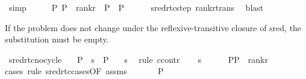 \begin{isabellebody}
\ simp\isanewline
\ \ \isamarkupfalse%
\ \isamarkupfalse%
\ {\isachardoublequoteopen}{\isacharparenleft}{\kern0pt}P{}{\isacharcomma}{\kern0pt}\ P{}{\isacharparenright}{\kern0pt}\ {\isasymin}\ rank{\isacharunderscore}{\kern0pt}r\ {\isasymor}\ P{}\ {\isacharequal}{\kern0pt}\ P{}{\isachardoublequoteclose}\isanewline
\ \ \ \ \isamarkupfalse%
\ sred{\isacharunderscore}{\kern0pt}rtc{\isacharunderscore}{\kern0pt}step\ rank{\isacharunderscore}{\kern0pt}r{\isacharunderscore}{\kern0pt}trans\ \isamarkupfalse%
\ blast\isanewline
{}\isamarkupfalse%
%
\endisatagproof
{\isafoldproof}%
%
\isadelimproof
%
\endisadelimproof
%
\begin{isamarkuptext}%
If the problem does not change under the reflexive-transitive closure of sred,
the substitution must be empty.%
\end{isamarkuptext}\isamarkuptrue%
\isamarkupfalse%
\ sred{\isacharunderscore}{\kern0pt}rtc{\isacharunderscore}{\kern0pt}no{\isacharunderscore}{\kern0pt}cycle{\isacharcolon}{\kern0pt}\isanewline
\ \ \ {\isachardoublequoteopen}P\ {\isasymturnstile}\ s\ {\isasymleadsto}\isactrlsup {\isacharasterisk}{\kern0pt}\ P{\isachardoublequoteclose}\isanewline
\ \ \ {\isachardoublequoteopen}s\ {\isacharequal}{\kern0pt}\ {\isacharbrackleft}{\kern0pt}{\isacharbrackright}{\kern0pt}{\isachardoublequoteclose}\isanewline
%
\isadelimproof
%
\endisadelimproof
%
\isatagproof
{}\isamarkupfalse%
{\isacharparenleft}{\kern0pt}rule\ ccontr{\isacharparenright}{\kern0pt}\isanewline
\ \ \isamarkupfalse%
\ {\isachardoublequoteopen}s\ {\isasymnoteq}\ {\isacharbrackleft}{\kern0pt}{\isacharbrackright}{\kern0pt}{\isachardoublequoteclose}\isanewline
\ \ \isamarkupfalse%
\ {\isachardoublequoteopen}{\isacharparenleft}{\kern0pt}P{\isacharcomma}{\kern0pt}P{\isacharparenright}{\kern0pt}\ {\isasymin}\ rank{\isacharunderscore}{\kern0pt}r{\isachardoublequoteclose}\isanewline
\ \ \isamarkupfalse%
{\isacharparenleft}{\kern0pt}cases\ rule{\isacharcolon}{\kern0pt}\ sred{\isacharunderscore}{\kern0pt}rtc{\isachardot}{\kern0pt}cases{\isacharbrackleft}{\kern0pt}OF\ assms{\isacharbrackright}{\kern0pt}{\isacharparenright}{\kern0pt}\isanewline
\ \ \ \ \isamarkupfalse%
\ {\isacharparenleft}{\kern0pt}{}\ P{}{\isacharparenright}{\kern0pt}\isanewline
\ \ \ \ \isamarkupfalse%

\end{isabellebody}
